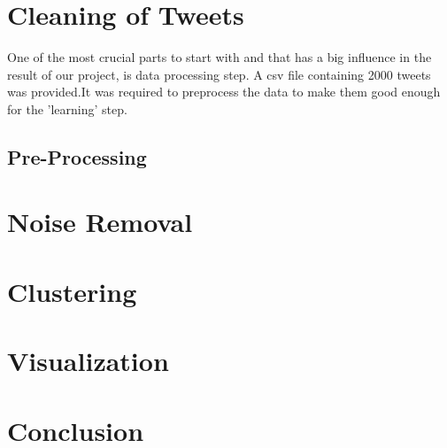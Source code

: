 \documentclass{article}
\begin{document}
        \section{ Cleaning of Tweets }
One of the most crucial parts to start with and that has a big influence in the result of our project, is data processing step. A csv file containing 2000 tweets was provided.It was required to preprocess the data to make them good enough for the 'learning' step. 
        
        \subsection{Pre-Processing}
        
        
        \section{Noise Removal}


        \section{Clustering}


        \section{Visualization}

    
        \section{Conclusion}



      
    
    
    \nocite{*}
\end{document}
